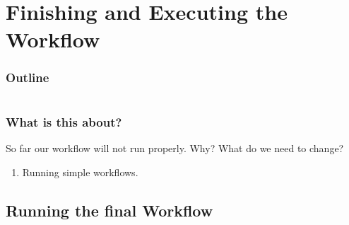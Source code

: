 \section{Finishing and Executing the Workflow}

\begin{frame}
    \frametitle{Outline}
    \begin{columns}[t]
        \begin{column}{.5\textwidth}
            \tableofcontents[sections={1-7},currentsection]
        \end{column}
        \begin{column}{.5\textwidth}
            \tableofcontents[sections={8-15},currentsection]
        \end{column}
    \end{columns}
\end{frame}

\begin{frame}
  \frametitle{What is this about?}
   \begin{question}[Questions]
      So far our workflow will not run properly. Why? What do we need to change?
   \end{question}
   \begin{docs}[Objectives]
   	  \begin{enumerate}
                      \item Running simple workflows.
      \end{enumerate}
    \end{docs}
\end{frame}

\subsection{Running the final Workflow}

